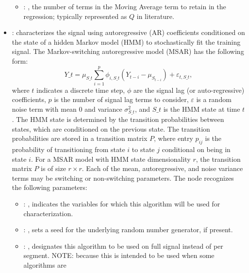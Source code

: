 \begin{itemize}
\begin{itemize}
        \item {}: ,
          the number of terms in the Moving Average term to retain in the
          regression; typically represented as $Q$ in literature.
      \end{itemize}

    \item {}:
      characterizes the signal using autoregressive (AR) coefficients conditioned         on the
      state of a hidden Markov model (HMM) to stochastically fit the training signal.         The
      Markov-switching autoregressive model (MSAR) has the following form:         \begin{equation*}
      Y\_t = \mu_{S\_t} \sum_{i=1}^p \phi_{i,{S\_t}} \left(Y_{t-i} - \mu_{S_{t-i}}\right) +
      \varepsilon_{t,{S\_t}},         \end{equation*}         where $t$ indicates a discrete time
      step, $\phi$ are the signal lag (or auto-regressive)         coefficients, $p$ is the number
      of signal lag terms to consider, $\varepsilon$ is a random noise         term with mean 0 and
      variance $\sigma^2_{S\_t}$, and $S\_t$ is the HMM state at time $t$.         The HMM state is
      determined by the transition probabilities between states, which are conditioned         on
      the previous state. The transition probabilities are stored in a transition matrix $P$,
      where entry $p_{ij}$ is the probability of transitioning from state $i$ to state $j$
      conditional         on being in state $i$. For a MSAR model with HMM state dimensionality $r$,
      the transition matrix         $P$ is of size $r \times r$. Each of the mean, autoregressive,
      and noise variance terms may be         switching or non-switching parameters.
      The  node recognizes the following parameters:
        \begin{itemize}
          \item {}: ,
            indicates the variables for which this algorithm will be used for characterization.
          \item {}: ,
            sets a seed for the underlying random number generator, if present.
          \item {}: ,
            designates this algorithm to be used on full signal instead of per
            segment. NOTE: because this is intended to be used when some algorithms are

\end{itemize}
\end{itemize}
